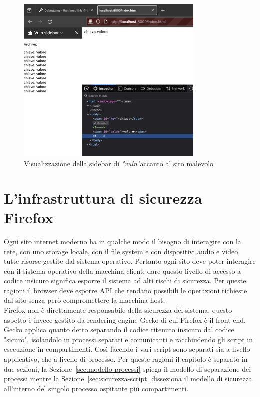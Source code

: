 \documentclass{sapthesis}
\newcommand{\refSection}[1]{Sezione~\ref{#1}}
\newcommand{\vuln}{\textit{"vuln"}}
\begin{document}
        \begin{figure}[ht]
            \centering                                                  
            \includegraphics[width=0.8\textwidth]{sidebar-screenshot.png}
            \caption{Visualizzazione della sidebar di \vuln accanto al sito malevolo}
            \label{fig:sidebar-screenshot}                             
        \end{figure}
    

\chapter{L'infrastruttura di sicurezza Firefox}
\label{cap:infrastruttura-sicurezza-firefox}
    Ogni sito internet moderno ha in qualche modo il bisogno di interagire con la rete,
    con uno storage locale, con il file system e con dispositivi audio e video, tutte
    risorse gestite dal sistema operativo. Pertanto ogni sito deve poter interagire con
    il sistema operativo della macchina client; dare questo livello di accesso a codice
    insicuro significa esporre il sistema ad alti rischi di sicurezza. Per queste ragioni
    il browser deve esporre API che rendano possibili le operazioni richieste dal sito
    senza però compromettere la macchina host.\\
    Firefox non è direttamente responsabile della sicurezza del sistema, questo aspetto è
    invece gestito da rendering engine Gecko di cui Firefox è il front-end.
    Gecko applica quanto detto separando il codice ritenuto insicuro dal codice "sicuro",
    isolandolo in processi separati e comunicanti e racchiudendo gli script in esecuzione in compartimenti.
    Così facendo i vari script sono separati sia a
    livello applicativo, che a livello di processo.
    Per queste ragioni il capitolo è separato in due sezioni, la \refSection{sec:modello-processi}
    spiega il modello di separazione dei processi mentre la \refSection{sec:sicurezza-script}
    disseziona il modello di sicurezza all'interno del singolo processo ospitante più
    compartimenti.
\end{document}
